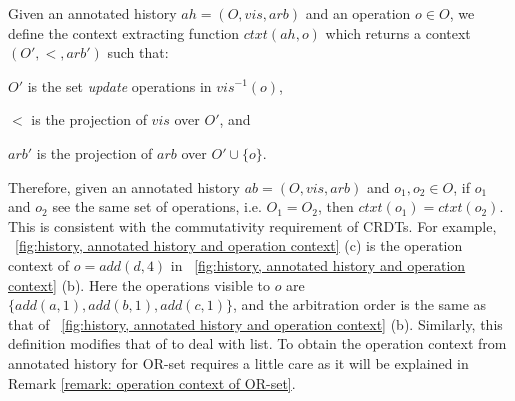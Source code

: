 
Given an annotated history $ah = (O,\mathit{vis},\mathit{arb})$ and an
operation $o \in O$, we define the context extracting function $ctxt(ah, o)$
which returns a context $(O', <, \mathit{arb'})$ such that:
\begin{inparaenum}[(i)]
\item $O'$ is the set \emph{update} operations in $\mathit{vis}^{-1}(o)$,
\item $<$ is the projection of $\mathit{vis}$ over $O'$, and
\item $\mathit{arb'}$ is the projection of $\mathit{arb}$ over $O' \cup \{o\}$.
\end{inparaenum} Therefore, given an annotated history $ab =
(O,\mathit{vis},\mathit{arb})$ and $o_1,o_2 \in O$, if $o_1$ and $o_2$
see the same set of operations, i.e. $O_1 = O_2$, then $ctxt(o_1) = ctxt(o_2)$.
%
This is consistent with the commutativity requirement of CRDTs.
For example, \figurename~\ref{fig:history, annotated history and
  operation context}
(c) is the operation context of $o = \mathit{add}(d,4)$ in
\figurename~\ref{fig:history, annotated history and operation context}
(b).
Here the operations visible to $o$ are $\{
\mathit{add}(a,1), \mathit{add}(b,1), \mathit{add}(c,1)\}$, and the
arbitration order is the same as that of \figurename~\ref{fig:history, annotated history and operation context}
(b).
Similarly, this definition modifies that of \cite{Burckhardt:2014}
to deal with list.
%
To obtain the operation context from annotated history for OR-set
requires a little care as it will be explained in Remark \ref{remark:
  operation context of OR-set}.


